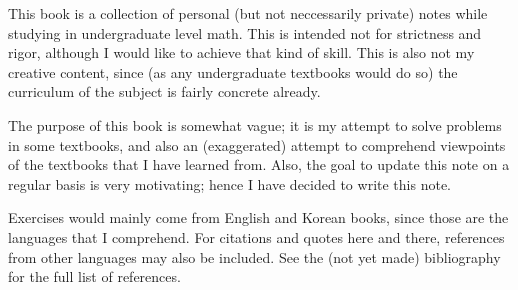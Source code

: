 
This book is a collection
of personal (but not neccessarily private) notes
while studying in undergraduate level math.
This is intended not for strictness and rigor,
although I would like to achieve that kind of skill.
This is also not my creative content,
since (as any undergraduate textbooks would do so)
the curriculum of the subject is fairly concrete already.

The purpose of this book is somewhat vague;
it is my attempt to solve problems in some textbooks,
and also an (exaggerated) attempt to comprehend viewpoints of
the textbooks that I have learned from.
Also, the goal to update this note on a regular basis
is very motivating;
hence I have decided to write this note.

Exercises would mainly come from English and Korean books,
since those are the languages that I comprehend.
For citations and quotes here and there,
references from other languages may also be included.
See the (not yet made) bibliography for the full list of references.

